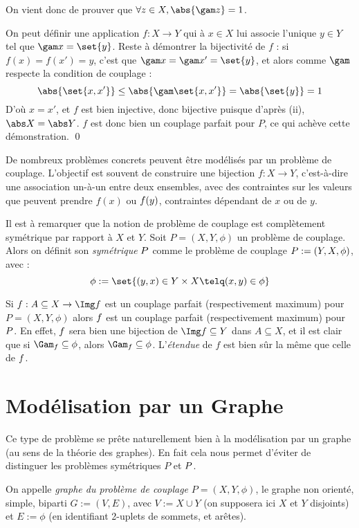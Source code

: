     On vient donc de prouver que $\forall z \in X, \abs{\gam z} = 1$.
    
    On peut définir une application $f : X \to Y$ qui à $x \in X$ lui associe l'unique $y \in Y$ tel que $\gam x = \set{y}$. Reste à démontrer la bijectivité de $f$ : si $f(x) = f(x') = y$, c'est que $\gam x = \gam x' = \set{y}$, et alors comme $\gam$ respecte la condition de couplage :
    \[ \abs{\set{x,x'}} \leq \abs{\gam\set{x, x'}} = \abs{\set{y}} = 1 \]
    D'où $x = x'$, et $f$ est bien injective, donc bijective puisque d'après (ii), $\abs X = \abs Y$. $f$ est donc bien un couplage parfait pour $P$, ce qui achève cette démonstration.
 \qed\SEP
 
 De nombreux problèmes concrets peuvent être modélisés par un problème de couplage. L'objectif est souvent de construire une bijection $f : X \to Y$, c'est-à-dire une association un-à-un entre deux ensembles, avec des contraintes sur les valeurs que peuvent prendre $f(x)$ ou $f\-(y)$, contraintes dépendant de $x$ ou de $y$.
 
 Il est à remarquer que la notion de problème de couplage est complètement symétrique par rapport à $X$ et $Y$.
 \SEP\jdefi
    Soit $P = (X,Y,\phi)$ un problème de couplage. Alors on définit son \emph{symétrique} $P\-$ comme le problème de couplage $P\- := (Y,X,\phi\-)$, avec :
    \[\phi\- := \set{ (y,x) \in Y \times X \telq (x,y) \in \phi } \]
 \SEP
 
 Si $f : A \subseteq X \to \Img f$ est un couplage parfait (respectivement maximum) pour $P = (X,Y,\phi)$ alors $f\-$ est un couplage parfait (respectivement maximum) pour $P\-$. En effet, $f\-$ sera bien une bijection de $\Img f \subseteq Y$ dans $A \subseteq X$, et il est clair que si $\Gam_f \subseteq \phi$, alors $\Gam_{f\-} \subseteq \phi\-$. L'\emph{étendue} de $f$ est bien sûr la même que celle de $f\-$.
 
 \section{Modélisation par un Graphe}
 
 Ce type de problème se prête naturellement bien à la modélisation par un graphe (au sens de la théorie des graphes). En fait cela nous permet d'éviter de distinguer les problèmes symétriques $P$ et $P\-$.
 
 \SEP\jdefi On appelle \emph{graphe du problème de couplage} $P = (X,Y,\phi)$, le graphe non orienté, simple, biparti $G := (V, E)$, avec $V := X \cup Y$ (on supposera ici $X$ et $Y$ disjoints) et $E := \phi$ (en identifiant 2-uplets de sommets, et arêtes).
 
